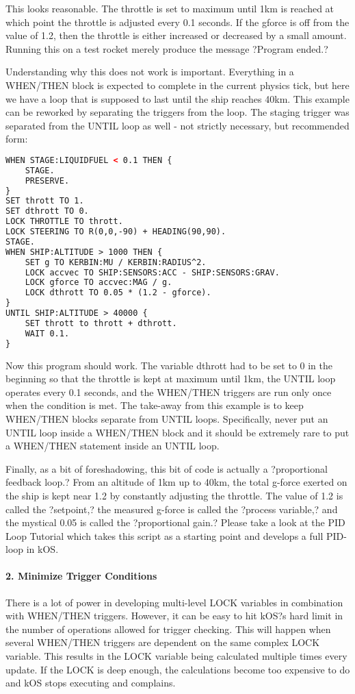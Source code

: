 This looks reasonable. The throttle is set to maximum until 1km is reached at which point the throttle is adjusted every 0.1 seconds. If the gforce is off from the value of 1.2, then the throttle is either increased or decreased by a small amount. Running this on a test rocket merely produce the message ?Program ended.?

Understanding why this does not work is important. Everything in a WHEN/THEN block is expected to complete in the current physics tick, but here we have a loop that is supposed to last until the ship reaches 40km. This example can be reworked by separating the triggers from the loop. The staging trigger was separated from the UNTIL loop as well - not strictly necessary, but recommended form:

\begin{lstlisting}[frame=single,language=XML]
WHEN STAGE:LIQUIDFUEL < 0.1 THEN {
    STAGE.
    PRESERVE.
}
SET thrott TO 1.
SET dthrott TO 0.
LOCK THROTTLE TO thrott.
LOCK STEERING TO R(0,0,-90) + HEADING(90,90).
STAGE.
WHEN SHIP:ALTITUDE > 1000 THEN {
    SET g TO KERBIN:MU / KERBIN:RADIUS^2.
    LOCK accvec TO SHIP:SENSORS:ACC - SHIP:SENSORS:GRAV.
    LOCK gforce TO accvec:MAG / g.
    LOCK dthrott TO 0.05 * (1.2 - gforce).
}
UNTIL SHIP:ALTITUDE > 40000 {
    SET thrott to thrott + dthrott.
    WAIT 0.1.
}
\end{lstlisting} 

Now this program should work. The variable dthrott had to be set to 0 in the beginning so that the throttle is kept at maximum until 1km, the UNTIL loop operates every 0.1 seconds, and the WHEN/THEN triggers are run only once when the condition is met. The take-away from this example is to keep WHEN/THEN blocks separate from UNTIL loops. Specifically, never put an UNTIL loop inside a WHEN/THEN block and it should be extremely rare to put a WHEN/THEN statement inside an UNTIL loop.

Finally, as a bit of foreshadowing, this bit of code is actually a ?proportional feedback loop.? From an altitude of 1km up to 40km, the total g-force exerted on the ship is kept near 1.2 by constantly adjusting the throttle. The value of 1.2 is called the ?setpoint,? the measured g-force is called the ?process variable,? and the mystical 0.05 is called the ?proportional gain.? Please take a look at the PID Loop Tutorial which takes this script as a starting point and develops a full PID-loop in kOS.

\paragraph{2. Minimize Trigger Conditions}
There is a lot of power in developing multi-level LOCK variables in combination with WHEN/THEN triggers. However, it can be easy to hit kOS?s hard limit in the number of operations allowed for trigger checking. This will happen when several WHEN/THEN triggers are dependent on the same complex LOCK variable. This results in the LOCK variable being calculated multiple times every update. If the LOCK is deep enough, the calculations become too expensive to do and kOS stops executing and complains.

